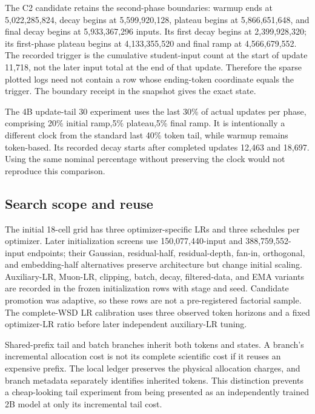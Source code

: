 The C2 candidate retains the second-phase boundaries: warmup ends at 5,022,285,824, decay begins at 5,599,920,128, plateau begins at 5,866,651,648, and final decay begins at 5,933,367,296 inputs. Its first decay begins at 2,399,928,320; its first-phase plateau begins at 4,133,355,520 and final ramp at 4,566,679,552. The recorded trigger is the cumulative student-input count at the start of update 11,718, not the later input total at the end of that update. Therefore the sparse plotted logs need not contain a row whose ending-token coordinate equals the trigger. The boundary receipt in the snapshot gives the exact state.

The 4B update-tail 30 experiment uses the last 30\% of actual updates per phase, comprising 20\% initial ramp,5\% plateau,5\% final ramp. It is intentionally a different clock from the standard last 40\% token tail, while warmup remains token-based. Its recorded decay starts after completed updates 12,463 and 18,697. Using the same nominal percentage without preserving the clock would not reproduce this comparison.

\subsection{Search scope and reuse}

The initial 18-cell grid has three optimizer-specific LRs and three schedules per optimizer. Later initialization screens use 150,077,440-input and 388,759,552-input endpoints; their Gaussian, residual-half, residual-depth, fan-in, orthogonal, and embedding-half alternatives preserve architecture but change initial scaling. Auxiliary-LR, Muon-LR, clipping, batch, decay, filtered-data, and EMA variants are recorded in the frozen initialization rows with stage and seed. Candidate promotion was adaptive, so these rows are not a pre-registered factorial sample. The complete-WSD LR calibration uses three observed token horizons and a fixed optimizer-LR ratio before later independent auxiliary-LR tuning.

Shared-prefix tail and batch branches inherit both tokens and states. A branch's incremental allocation cost is not its complete scientific cost if it reuses an expensive prefix. The local ledger preserves the physical allocation charges, and branch metadata separately identifies inherited tokens. This distinction prevents a cheap-looking tail experiment from being presented as an independently trained 2B model at only its incremental tail cost.


